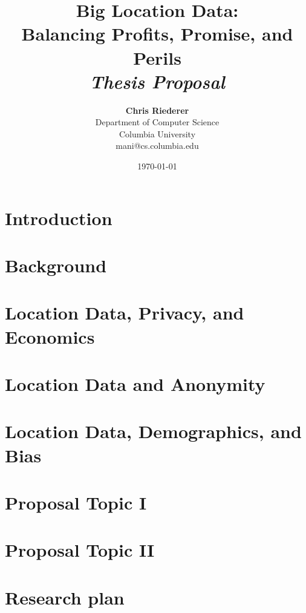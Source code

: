 \documentclass[12pt]{article}
\title{{\bf Big Location Data: \\ Balancing Profits, Promise, and Perils} \\
\it Thesis Proposal}
\author{ {\bf Chris Riederer}  \\
Department of Computer Science \\
Columbia University\\
{\small mani@cs.columbia.edu}
}
\date{\today}
\begin{document}
\pagestyle{plain}
\maketitle

\pagebreak
\begin{abstract}

\end{abstract}

\pagebreak
\tableofcontents
\pagebreak

\cleardoublepage
{}

\section{Introduction}
\label{ch:intro}



\section{Background}
\label{sec:background}



\section{Location Data, Privacy, and Economics}
\label{sec:econ}



\section{Location Data and Anonymity}
\label{sec:anon}




\section{Location Data, Demographics, and Bias}
\label{sec:bias}



\section{Proposal Topic I}
\label{sec:proposal-i}



\section{Proposal Topic II}
\label{sec:proposal-ii}



\section{Research plan}
\label{sec:plan}



\pagebreak

\begin{footnotesize}

% 

\end{footnotesize}
\end{document}
